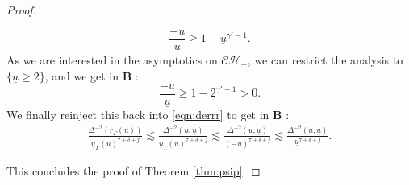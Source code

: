 \documentclass[10pt,a4paper]{amsart}
\newcommand{\ch}{\mathcal{CH_+}}
\newcommand{\ubar}{{\underline{u}}}
\begin{document}
\begin{proof}
\begin{itemize}
    $$\frac{-u}{\ubar}\geq 1-\ubar^{\gamma'-1}.$$
    As we are interested in the asymptotics on $\ch$, we can restrict the analysis to $\{\ubar\geq 2\}$, and we get in $\mathbf{B}$ : 
    $$\frac{-u}{\ubar}\geq 1-2^{\gamma'-1}>0.$$
    We finally reinject this back into \eqref{eqn:derrr} to get in $\mathbf{B}$ :
    \begin{align*}
        \frac{\Delta^{-2}(r_\Gamma(u))}{\ubar_\Gamma(u)^{7+\delta+j}}\lesssim\frac{\Delta^{-2}(u,\ubar)}{\ubar_\Gamma(u)^{7+\delta+j}}\lesssim\frac{\Delta^{-2}(u,\ubar)}{(-u)^{7+\delta+j}}\lesssim\frac{\Delta^{-2}(u,\ubar)}{\ubar^{7+\delta+j}}.
    \end{align*}
\end{itemize}
This concludes the proof of Theorem \ref{thm:psip}.
\end{proof}
\end{document}
